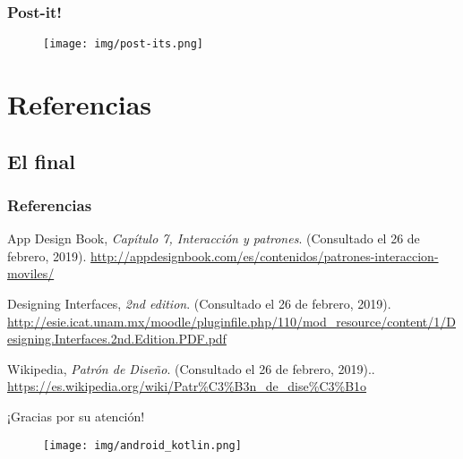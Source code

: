 \documentclass{beamer}
\begin{document}

\begin{frame}
\frametitle{Post-it!}

\begin{figure}[H]
  \centering
  \texttt{[image: img/post-its.png]}
\end{figure}
\end{frame}

\section{Referencias}
\subsection{El final}

\begin{frame}
\frametitle{Referencias}
\footnotesize{
\begin{thebibliography}{99} %
 App Design Book, \emph{Capítulo 7, Interacción y patrones}.
\newblock (Consultado el 26 de febrero, 2019).
\newblock \url{http://appdesignbook.com/es/contenidos/patrones-interaccion-moviles/}

\bibitem[]{} Designing Interfaces, \emph{2nd edition}. \newblock (Consultado el 26 de febrero, 2019).
\newblock \url{http://esie.icat.unam.mx/moodle/pluginfile.php/110/mod_resource/content/1/Designing.Interfaces.2nd.Edition.PDF.pdf}

\bibitem[]{} Wikipedia, \emph{Patrón de Diseño}.
\newblock (Consultado el 26 de febrero, 2019)..
\newblock \url{https://es.wikipedia.org/wiki/Patr\%C3\%B3n_de_dise\%C3\%B1o}

\end{thebibliography}
}
\end{frame}


\begin{frame}
\Huge{\centerline{¡Gracias por su atención!}}

\begin{figure}[H]
  \centering
  \texttt{[image: img/android\_kotlin.png]}
\end{figure}
\end{frame}

\end{document}
